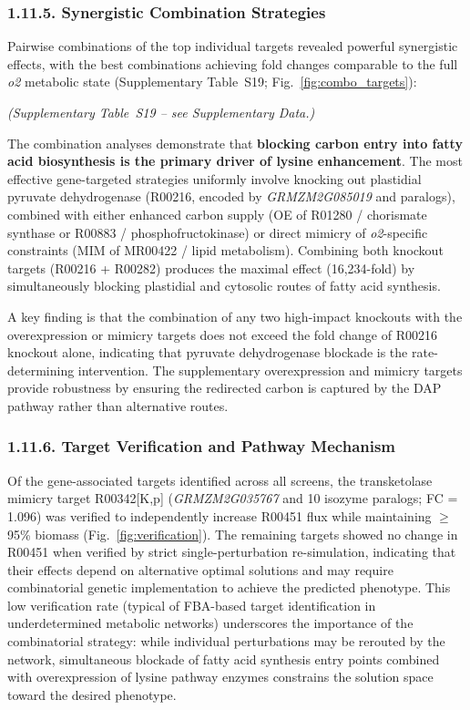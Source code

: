 \documentclass[12pt,a4paper]{article}
\begin{document}
\subsubsection{1.11.5. Synergistic Combination Strategies}

Pairwise combinations of the top individual targets revealed powerful synergistic effects, with the best combinations achieving fold changes comparable to the full \textit{o2} metabolic state (Supplementary Table~S19; Fig.~\ref{fig:combo_targets}):


\noindent\textit{(Supplementary Table~S19 -- see Supplementary Data.)}


The combination analyses demonstrate that \textbf{blocking carbon entry into fatty acid biosynthesis is the primary driver of lysine enhancement}. The most effective gene-targeted strategies uniformly involve knocking out plastidial pyruvate dehydrogenase (R00216, encoded by \textit{GRMZM2G085019} and paralogs), combined with either enhanced carbon supply (OE of R01280 / chorismate synthase or R00883 / phosphofructokinase) or direct mimicry of \textit{o2}-specific constraints (MIM of MR00422 / lipid metabolism). Combining both knockout targets (R00216 + R00282) produces the maximal effect (16,234-fold) by simultaneously blocking plastidial and cytosolic routes of fatty acid synthesis.

A key finding is that the combination of any two high-impact knockouts with the overexpression or mimicry targets does not exceed the fold change of R00216 knockout alone, indicating that pyruvate dehydrogenase blockade is the rate-determining intervention. The supplementary overexpression and mimicry targets provide robustness by ensuring the redirected carbon is captured by the DAP pathway rather than alternative routes.

\subsubsection{1.11.6. Target Verification and Pathway Mechanism}

Of the gene-associated targets identified across all screens, the transketolase mimicry target R00342[K,p] (\textit{GRMZM2G035767} and 10 isozyme paralogs; FC = 1.096) was verified to independently increase R00451 flux while maintaining $\geq$95\% biomass (Fig.~\ref{fig:verification}). The remaining targets showed no change in R00451 when verified by strict single-perturbation re-simulation, indicating that their effects depend on alternative optimal solutions and may require combinatorial genetic implementation to achieve the predicted phenotype. This low verification rate (typical of FBA-based target identification in underdetermined metabolic networks) underscores the importance of the combinatorial strategy: while individual perturbations may be rerouted by the network, simultaneous blockade of fatty acid synthesis entry points combined with overexpression of lysine pathway enzymes constrains the solution space toward the desired phenotype.
\end{document}
